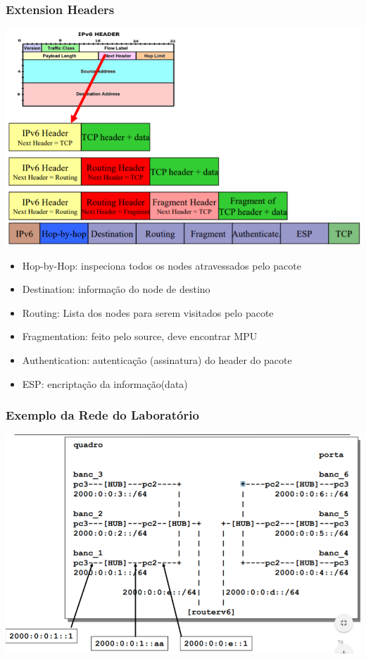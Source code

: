 \documentclass{article}
\begin{document}
\subsubsection{Extension Headers}
\begin{center}
    \includegraphics[width=14cm]{images/RCOM38.png}
\end{center}
\begin{itemize}
    \item Hop-by-Hop: inspeciona todos os nodes atravessados pelo pacote
    \item Destination: informação do node de destino
    \item Routing: Lista dos nodes para serem visitados pelo pacote
    \item Fragmentation: feito pelo source, deve encontrar MPU
    \item Authentication: autenticação (assinatura) do header do pacote
    \item ESP: encriptação da informação(data)
\end{itemize}

\subsubsection{Exemplo da Rede do Laboratório}
\begin{center}
    \includegraphics[width=14cm]{images/RCOM39.png}
\end{center}
\end{document}
